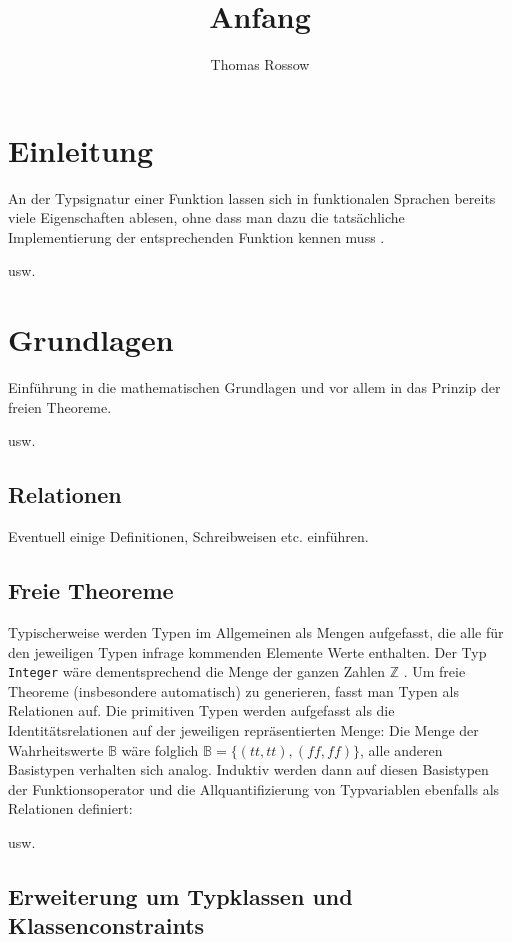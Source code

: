 \documentclass[11pt]{article} %
\title{Anfang}
\author{Thomas Rossow}
\begin{document}
\maketitle

\section{Einleitung}

An der Typsignatur einer Funktion lassen sich in funktionalen Sprachen bereits viele Eigenschaften ablesen, ohne dass man dazu die
tatsächliche Implementierung der entsprechenden Funktion kennen muss \cite{bla}.

usw.

\section{Grundlagen}

Einführung in die mathematischen Grundlagen und vor allem in das Prinzip der freien Theoreme.

usw.

\subsection{Relationen}

Eventuell einige Definitionen, Schreibweisen etc. einführen.

\subsection{Freie Theoreme}
\label{sec:freie-theoreme}

Typischerweise werden Typen im Allgemeinen als Mengen aufgefasst, die alle für den jeweiligen Typen infrage kommenden Elemente Werte enthalten. Der Typ \texttt{Integer}
wäre dementsprechend die Menge der ganzen Zahlen $\mathbb{Z}$ \cite{bla}.
Um freie Theoreme (insbesondere automatisch) zu generieren, fasst man Typen als Relationen auf. Die primitiven Typen werden aufgefasst als die Identitätsrelationen auf der jeweiligen repräsentierten Menge: Die Menge der Wahrheitswerte $\mathbb{B}$ wäre folglich $\mathbb{B} = \{({tt}, {tt}), ({ff}, {ff})\}$, alle anderen Basistypen verhalten sich analog.
Induktiv werden dann auf diesen Basistypen der Funktionsoperator und die Allquantifizierung von Typvariablen ebenfalls als Relationen definiert:

usw.

\subsection{Erweiterung um Typklassen und Klassenconstraints}
\end{document}
